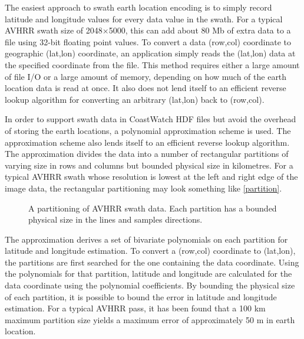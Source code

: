 The easiest approach to swath earth location encoding is to simply
record latitude and longitude values for every data value in the
swath. For a typical AVHRR swath size of 2048$\times$5000, this can
add about 80 Mb of extra data to a file using 32-bit floating point
values. To convert a data (row,col) coordinate to geographic (lat,lon)
coordinate, an application simply reads the (lat,lon) data at the
specified coordinate from the file. This method requires either a
large amount of file I/O or a large amount of memory, depending on how
much of the earth location data is read at once. It also does not lend
itself to an efficient reverse lookup algorithm for converting an
arbitrary (lat,lon) back to (row,col).

In order to support swath data in CoastWatch HDF files but avoid the
overhead of storing the earth locations, a polynomial approximation
scheme is used. The approximation scheme also lends itself to an
efficient reverse lookup algorithm. The approximation divides the data
into a number of rectangular partitions of varying size in rows and
columns but bounded physical size in kilometres. For a typical AVHRR
swath whose resolution is lowest at the left and right edge of the
image data, the rectangular partitioning may look something like
\autoref{partition}.

\begin{figure}
  \begin{center}
    \caption[A partitioning of AVHRR swath data]{
      A partitioning of AVHRR swath data.  Each partition has a bounded
      physical size in the lines and samples directions.
    }
    \label{partition}
  \end{center}
\end{figure}

The approximation derives a set of bivariate polynomials on each
partition for latitude and longitude estimation. To convert a
(row,col) coordinate to (lat,lon), the partitions are first searched
for the one containing the data coordinate. Using the polynomials for
that partition, latitude and longitude are calculated for the data
coordinate using the polynomial coefficients. By bounding the physical
size of each partition, it is possible to bound the error in latitude
and longitude estimation. For a typical AVHRR pass, it has been found
that a 100 km maximum partition size yields a maximum error of
approximately 50 m in earth location.

